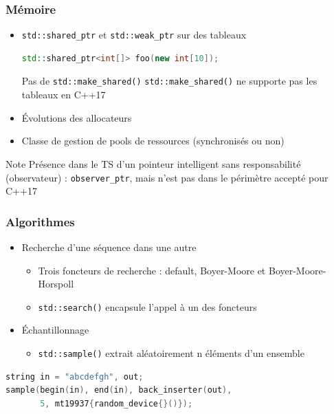 \documentclass[C++.tex]{subfiles}
\begin{document}
\begin{frame}[fragile]
	\frametitle{Mémoire}
	\begin{itemize}
		\item \lstinline|std::shared_ptr| et \lstinline|std::weak_ptr| sur des tableaux

	\begin{lstlisting}[language=C++]
std::shared_ptr<int[]> foo(new int[10]);\end{lstlisting}

\begin{alertblock}{Pas de \lstinline|std::make_shared()|}
	\lstinline|std::make_shared()| ne supporte pas les tableaux en C++17
\end{alertblock}

		\item Évolutions des allocateurs


		\item Classe de gestion de pools de ressources (synchronisés ou non)
	\end{itemize}

	\begin{block}{Note}
		Présence dans le TS d'un pointeur intelligent sans responsabilité (observateur) : \lstinline|observer_ptr|, mais n'est pas dans le périmètre accepté pour C++17
	\end{block}
\end{frame}

\begin{frame}[fragile]
	\frametitle{Algorithmes}
	\begin{itemize}
		\item Recherche d'une séquence dans une autre
		\begin{itemize}
			\item Trois foncteurs de recherche : default, Boyer-Moore et Boyer-Moore-Horspoll
			\item \lstinline|std::search()| encapsule l'appel à un des foncteurs
		\end{itemize}
		\item Échantillonnage
		\begin{itemize}
			\item \lstinline|std::sample()| extrait aléatoirement n éléments d'un ensemble
		\end{itemize}
	\end{itemize}

	\begin{lstlisting}[language=C++]
string in = "abcdefgh", out;
sample(begin(in), end(in), back_inserter(out), 
       5, mt19937{random_device{}()});\end{lstlisting}
\end{frame}
\end{document}
